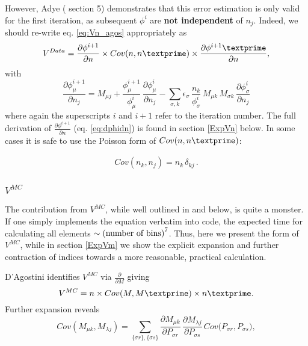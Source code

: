 However, Adye (\cite{adye} section 5) demonstrates that this error estimation is only valid for the first iteration, as subsequent $\phi^{i}$ are \textbf{not independent} of $n_{j}$. 
Indeed, we should re-write eq. \ref{eq:Vn_agos} appropriately as
\begin{equation} \label{eq:Vn_matrix}
	V^{Data} = 
	\frac{\partial \phi^{i+1}}{\partial n} \times
	Cov(n,n\textprime) \times
	\frac{\partial \phi^{i+1}\textprime}{\partial n} ,
\end{equation}
with 
\begin{equation*}
	\frac{\partial \phi^{i+1}_{\mu}}{\partial n_{j}}
	= M_{\mu j} + \frac{\phi^{i+1}_{\mu}}{\phi^{i}_{\mu}} \, \frac{\partial \phi^{i}_{\mu}}{\partial n_{j}}
	- \sum_{\sigma, k}{ \epsilon_{\sigma} \, \frac{n_{k}}{\phi^{i}_{\sigma}} \, M_{\mu k} \, M_{\sigma k} \, \frac{\partial \phi^{i}_{\sigma}}{\partial n_{j}}}
\end{equation*}
where again the superscripts $i$ and $i+1$ refer to the iteration number.
The full derivation of $\frac{\partial \phi^{i+1}}{\partial n}$ (eq. \ref{eq:dphidn}) is found in section \ref{ExpVn} below.
In some cases it is safe to use the Poisson form of $Cov(n,n\textprime)$:

\begin{equation}
 \begin{split}
Cov(n_{k},n_{j}) = n_{k} \, \delta_{kj} \,.
 \end{split}
\end{equation}

\subsubsection{$V^{MC}$}
The contribution from $V^{MC}$, while well outlined in \cite{agostini} and below, is quite a monster. If one simply implements the equation verbatim 
into code, the expected time for calculating all elements $\sim \textnormal{(number of bins)}^{7}$. Thus, here we present the form of $V^{MC}$, 
while in section \ref{ExpVm} we show the explicit expansion and further contraction of indices towards a more reasonable, practical calculation.

D'Agostini identifies $V^{MC}$ via $\frac{\partial}{\partial M}$ giving
\begin{equation} \label{eq:Vmc_dagos}
	V^{MC} = 
	n\times Cov(M,M\textprime) \times n\textprime.
\end{equation}
Further expansion reveals 
\begin{equation} \label{eq:CovMM}
	Cov(M_{\mu k},M_{\lambda j}) = 
	\sum_{\{\sigma r\},\{\sigma s\}} 
	\frac{\partial M_{\mu k}}{\partial P_{\sigma r}}
  \,
	\frac{\partial M_{\lambda j}}{\partial P_{\sigma s}} 
  \,
	Cov \big( P_{\sigma r}, P_{\sigma s} \big),
\end{equation}

